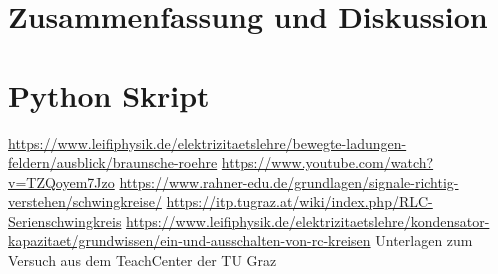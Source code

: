 \documentclass{article}
\begin{document}
\section{Zusammenfassung und Diskussion}



\appendix
\section{Python Skript}






%


%


\begin{thebibliography}{9}
 \url{https://www.leifiphysik.de/elektrizitaetslehre/bewegte-ladungen-feldern/ausblick/braunsche-roehre}
 \url{https://www.youtube.com/watch?v=TZQoyem7Jzo}
 \url{https://www.rahner-edu.de/grundlagen/signale-richtig-verstehen/schwingkreise/}
 \url{https://itp.tugraz.at/wiki/index.php/RLC-Serienschwingkreis}
 \url{https://www.leifiphysik.de/elektrizitaetslehre/kondensator-kapazitaet/grundwissen/ein-und-ausschalten-von-rc-kreisen}
 Unterlagen zum Versuch aus dem TeachCenter der TU Graz

\end{thebibliography}
\end{document}
